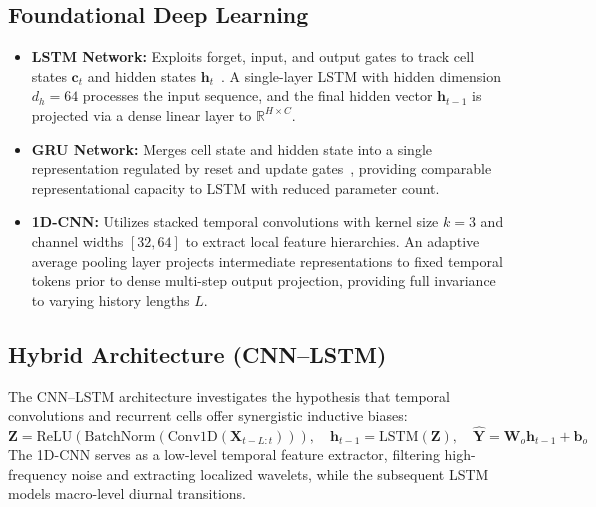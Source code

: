\documentclass[11pt,a4paper]{article}
\begin{document}
\subsection{Foundational Deep Learning}
\begin{itemize}
    \item \textbf{LSTM Network:} Exploits forget, input, and output gates to track cell states $\mathbf{c}_t$ and hidden states $\mathbf{h}_t$~\cite{hochreiter1997long}. A single-layer LSTM with hidden dimension $d_h=64$ processes the input sequence, and the final hidden vector $\mathbf{h}_{t-1}$ is projected via a dense linear layer to $\mathbb{R}^{H \times C}$.
    \item \textbf{GRU Network:} Merges cell state and hidden state into a single representation regulated by reset and update gates~\cite{cho2014learning}, providing comparable representational capacity to LSTM with reduced parameter count.
    \item \textbf{1D-CNN:} Utilizes stacked temporal convolutions with kernel size $k=3$ and channel widths $[32, 64]$ to extract local feature hierarchies. An adaptive average pooling layer projects intermediate representations to fixed temporal tokens prior to dense multi-step output projection, providing full invariance to varying history lengths $L$.
\end{itemize}

\subsection{Hybrid Architecture (CNN--LSTM)}
The CNN--LSTM architecture investigates the hypothesis that temporal convolutions and recurrent cells offer synergistic inductive biases:
\begin{equation}
    \mathbf{Z} = \text{ReLU}\left(\text{BatchNorm}\left(\text{Conv1D}\left(\mathbf{X}_{t-L:t}\right)\right)\right), \quad \mathbf{h}_{t-1} = \text{LSTM}\left(\mathbf{Z}\right), \quad \hat{\mathbf{Y}} = \mathbf{W}_o \mathbf{h}_{t-1} + \mathbf{b}_o
\end{equation}
The 1D-CNN serves as a low-level temporal feature extractor, filtering high-frequency noise and extracting localized wavelets, while the subsequent LSTM models macro-level diurnal transitions.
\end{document}
